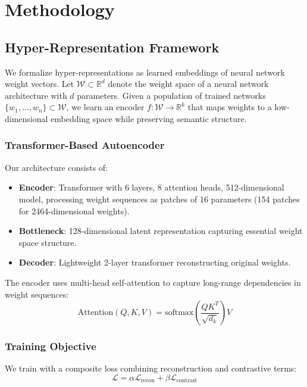 \section{Methodology}
\label{sec:method}

\subsection{Hyper-Representation Framework}

We formalize hyper-representations as learned embeddings of neural network weight vectors. Let $\mathcal{W} \subset \mathbb{R}^d$ denote the weight space of a neural network architecture with $d$ parameters. Given a population of trained networks $\{w_1, \ldots, w_n\} \subset \mathcal{W}$, we learn an encoder $f: \mathcal{W} \to \mathbb{R}^k$ that maps weights to a low-dimensional embedding space while preserving semantic structure.

\subsubsection{Transformer-Based Autoencoder}

Our architecture consists of:
\begin{itemize}
    \item \textbf{Encoder}: Transformer with 6 layers, 8 attention heads, 512-dimensional model, processing weight sequences as patches of 16 parameters (154 patches for 2464-dimensional weights).
    \item \textbf{Bottleneck}: 128-dimensional latent representation capturing essential weight space structure.
    \item \textbf{Decoder}: Lightweight 2-layer transformer reconstructing original weights.
\end{itemize}

The encoder uses multi-head self-attention to capture long-range dependencies in weight sequences:
\begin{equation}
\text{Attention}(Q, K, V) = \text{softmax}\left(\frac{QK^T}{\sqrt{d_k}}\right)V
\label{eq:attention}
\end{equation}

\subsubsection{Training Objective}

We train with a composite loss combining reconstruction and contrastive terms:
\begin{equation}
\mathcal{L} = \alpha \mathcal{L}_{\text{recon}} + \beta \mathcal{L}_{\text{contrast}}
\label{eq:composite_loss}
\end{equation}

